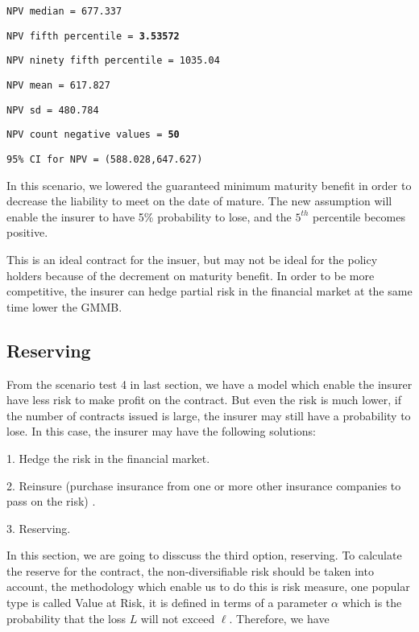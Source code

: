 \documentclass{report}
\begin{document}
\texttt{NPV median = 677.337}

{\renewcommand\baselinestretch{1}\selectfont

\texttt{NPV fifth percentile = \textbf{3.53572}}

\texttt{NPV ninety fifth percentile = 1035.04}

\texttt{NPV mean = 617.827}

\texttt{NPV sd = 480.784}

\texttt{NPV count negative values = \textbf{50}}

\texttt{95\% CI for NPV = (588.028,647.627)}
\par}

In this scenario, we lowered the guaranteed minimum maturity benefit in order to decrease the liability to meet on the date of mature. The new assumption will enable the insurer to have 5\% probability to lose, and the $5^{th}$ percentile becomes positive. 

This is an ideal contract for the insuer, but may not be ideal for the policy holders because of the decrement on maturity benefit. In order to be more competitive, the insurer can hedge partial risk in the financial market at the same time lower the  GMMB.


\subsection{Reserving}


From the scenario test 4 in last section, we have a model which enable the insurer have less risk to make profit on the contract. But even the risk is much lower, if the number of contracts issued is large, the insurer may still have a probability to lose. In this case, the insurer may have the following solutions\cite{bib:reserve}:

1. Hedge the risk in the financial market.

2. Reinsure (purchase insurance from one or more other insurance companies to pass on the risk) \cite{bib:reserve-wiki}.

3. Reserving.

In this section, we are going to disscuss the third option, reserving. To calculate the reserve for the contract, the non-diversifiable risk should be taken into account, the methodology which enable us to do this is risk measure\cite{bib:VaR}, one popular type is called Value at Risk, it is defined in terms of a parameter $\alpha$ which is the probability that the loss $L$ will not exceed $\ell$. Therefore, we have
\end{document}
